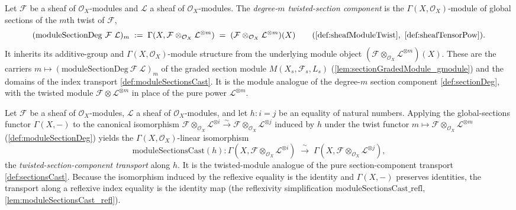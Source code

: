 \begin{definition}

  \label{def:moduleSectionDeg}
  Let \(\mathcal{F}\) be a sheaf of \(\mathcal{O}_X\)-modules and \(\mathcal{L}\) a
  sheaf of \(\mathcal{O}_X\)-modules. The \emph{degree-\(m\) twisted-section
  component} is the \(\Gamma(X,\mathcal{O}_X)\)-module of global sections of the
  \(m\)th twist of \(\mathcal{F}\),
  \[
    (\mathrm{moduleSectionDeg}\ \mathcal{F}\ \mathcal{L})_m
      \;:=\; \Gamma(X, \mathcal{F} \otimes_{\mathcal{O}_X} \mathcal{L}^{\otimes m})
      \;=\; (\mathcal{F} \otimes_{\mathcal{O}_X} \mathcal{L}^{\otimes m})(X)
        \qquad(\cref{def:sheafModuleTwist},\ \cref{def:sheafTensorPow}).
  \]
  It inherits its additive-group and \(\Gamma(X,\mathcal{O}_X)\)-module structure
  from the underlying module object
  \((\mathcal{F} \otimes_{\mathcal{O}_X} \mathcal{L}^{\otimes m})(X)\). These are the
  carriers \(m \mapsto (\mathrm{moduleSectionDeg}\ \mathcal{F}\ \mathcal{L})_m\) of
  the graded section module \(M(X_s, \mathcal{F}_s, L_s)\)
  (\cref{lem:sectionGradedModule_gmodule}) and the domains of the index transport
  \cref{def:moduleSectionsCast}. It is the module analogue of the degree-\(m\)
  section component \cref{def:sectionDeg}, with the twisted module
  \(\mathcal{F} \otimes \mathcal{L}^{\otimes m}\) in place of the pure power
  \(\mathcal{L}^{\otimes m}\).
\end{definition}

\begin{definition}

  \label{def:moduleSectionsCast}
  Let \(\mathcal{F}\) be a sheaf of \(\mathcal{O}_X\)-modules, \(\mathcal{L}\) a sheaf
  of \(\mathcal{O}_X\)-modules, and let \(h : i = j\) be an equality of natural
  numbers. Applying the global-sections functor \(\Gamma(X,-)\) to the canonical
  isomorphism
  \(\mathcal{F} \otimes_{\mathcal{O}_X} \mathcal{L}^{\otimes i}
    \xrightarrow{\sim}
    \mathcal{F} \otimes_{\mathcal{O}_X} \mathcal{L}^{\otimes j}\)
  induced by \(h\) under the twist functor
  \(m \mapsto \mathcal{F} \otimes_{\mathcal{O}_X} \mathcal{L}^{\otimes m}\)
  (\cref{def:moduleSectionDeg}) yields the \(\Gamma(X,\mathcal{O}_X)\)-linear
  isomorphism
  \[
    \mathrm{moduleSectionsCast}(h) :
    \Gamma(X, \mathcal{F} \otimes_{\mathcal{O}_X} \mathcal{L}^{\otimes i})
      \;\xrightarrow{\ \sim\ }\;
    \Gamma(X, \mathcal{F} \otimes_{\mathcal{O}_X} \mathcal{L}^{\otimes j}),
  \]
  the \emph{twisted-section-component transport} along \(h\). It is the
  twisted-module analogue of the pure section-component transport
  \cref{def:sectionsCast}. Because the isomorphism induced by the reflexive equality
  is the identity and \(\Gamma(X,-)\) preserves identities, the transport along a
  reflexive index equality is the identity map (the reflexivity simplification
  \(\mathrm{moduleSectionsCast\_refl}\), \cref{lem:moduleSectionsCast_refl}).
\end{definition}

